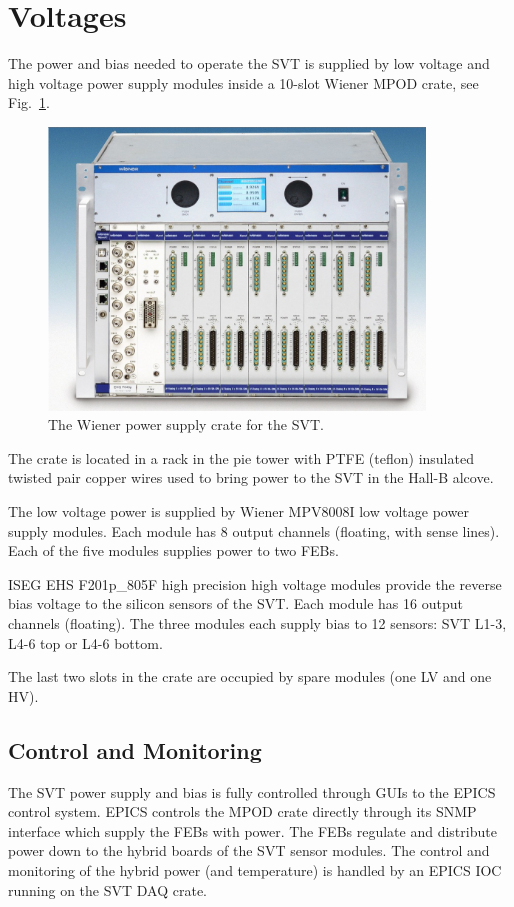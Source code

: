 \documentclass[12pt]{report}
\begin{document}
\section{Voltages}
The power and bias needed to operate the SVT is supplied by low voltage and high voltage power supply modules inside a 10-slot Wiener MPOD crate, see Fig.~\ref{fig:ec_crate}. 
\begin{figure}
\begin{center}
\includegraphics[width=10cm]{ec_create.png}
\caption{\label{fig:ec_crate}The Wiener power supply crate for the SVT.}
\end{center}
\end{figure}
The crate is located in a rack in the pie tower with PTFE (teflon) insulated twisted pair copper wires used to bring power to the SVT in the Hall-B alcove. 

The low voltage power is supplied by Wiener MPV8008I low voltage power supply modules. Each module has 8 output channels (floating, with sense lines).
Each of the five modules supplies power to two FEBs. 

ISEG EHS F201p\_805F high precision high voltage modules provide the reverse bias voltage to the silicon sensors of the SVT. Each module has 16 output channels (floating). The three modules each supply bias to 12 sensors: SVT L1-3, L4-6 top or L4-6 bottom.  

The last two slots in the crate are occupied by spare modules (one LV and one HV).

\subsection{Control and Monitoring}
The SVT power supply and bias is fully controlled through GUIs to the EPICS control system. 
EPICS controls the MPOD crate directly through its SNMP interface which supply the FEBs with power. 
The FEBs regulate and distribute power down to the hybrid boards of the SVT sensor modules. 
The control and monitoring of the hybrid power (and temperature) is handled by an EPICS IOC running on the SVT DAQ crate. 
\end{document}
